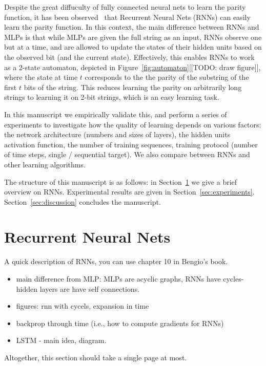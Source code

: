 \documentclass[fleqn,11pt]{article}
\begin{document}
{Despite the great diffuculty of fully connected neural nets to learn the parity function, it has been observed~\cite{hochreiter1996bridging, srivastava2015training, kalchbrenner2015grid} that Recurrent Neural Nets (RNNs) can easily learn the parity function. In this context, the main difference between RNNs and MLPs is that while MLPs are given the full string as an input, RNNs observe one but at a time, and are allowed to update the states of their hidden units based on the observed bit (and the current state). Effectively, this enables RNNs to work as a 2-state automaton, depicted in Figure~\ref{fig:automaton}[[TODO: draw figure]], where the state at time $t$ corresponds to the the parity of the substring of the first $t$ bits of the string. This reduces learning the parity on arbitrarily long strings to learning it on 2-bit strings, which is an easy learning task.

In this manuscript we empirically validate this, and perform a series of experiments to investigate how the quality of learning depends on various factors: the network architecture (numbers and sizes of layers), the hidden units activation function, the number of training sequences, training protocol (number of time steps, single / sequential target). We also compare between RNNs and other learning algorithms. 

The structure of this manuscript is as follows: in Section~\ref{sec:rnn} we give a brief overview on RNNs. Experimental results are given in Section~\ref{sec:experiments}. Section~\ref{sec:discussion} concludes the manuscript.




\section {Recurrent Neural Nets}
\label{sec:rnn}
A quick description of RNNs, you can use chapter 10 in Bengio's book.
\begin{itemize}
\item main difference from MLP: MLPs are acyclic graphs, RNNs have cycles- hidden layers are have self connections.
\item figures: rnn with cycels, expansion in time
\item backprop through time (i.e., how to compute gradients for RNNs)
\item LSTM - main idea, diagram.
\end{itemize}
Altogether, this section should take a single page at most.

}
\end{document}
